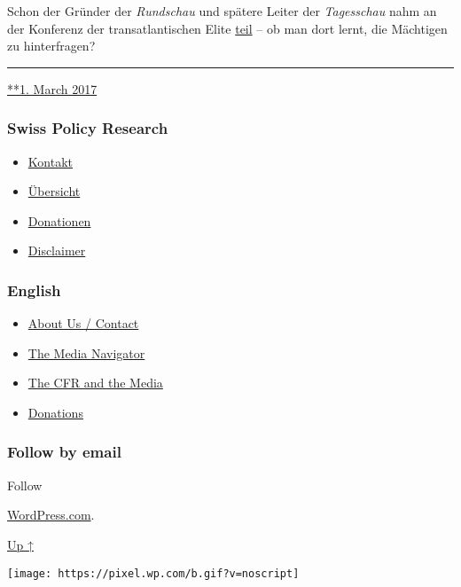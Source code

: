 Schon der Gründer der \emph{Rundschau} und spätere Leiter der
\emph{Tagesschau} nahm an der Konferenz der trans­atlantischen Elite
\href{https://wikileaks.org/plusd/cables/1978ZURICH00660_d.html}{teil}
-- ob man dort lernt, die Mächtigen zu hinterfragen?

\begin{center}\rule{0.5\linewidth}{\linethickness}\end{center}

\href{https://swprs.org/2017/03/01/srf-rundschau/}{**1. March 2017}

\hypertarget{swiss-policy-research}{%
\subsubsection{Swiss Policy Research}\label{swiss-policy-research}}

\begin{itemize}
\tightlist
\item
  \href{https://swprs.org/kontakt/}{Kontakt}
\item
  \href{https://swprs.org/uebersicht/}{Übersicht}
\item
  \href{https://swprs.org/donationen/}{Donationen}
\item
  \href{https://swprs.org/disclaimer/}{Disclaimer}
\end{itemize}

\hypertarget{english}{%
\subsubsection{English}\label{english}}

\begin{itemize}
\tightlist
\item
  \href{https://swprs.org/contact/}{About Us / Contact}
\item
  \href{https://swprs.org/media-navigator/}{The Media Navigator}
\item
  \href{https://swprs.org/the-american-empire-and-its-media/}{The CFR
  and the Media}
\item
  \href{https://swprs.org/donations/}{Donations}
\end{itemize}

\hypertarget{follow-by-email}{%
\subsubsection{Follow by email}\label{follow-by-email}}

Follow

\href{https://wordpress.com/?ref=footer_custom_com}{WordPress.com}.

\protect\hyperlink{}{Up ↑}

\texttt{[image: https://pixel.wp.com/b.gif?v=noscript]}
